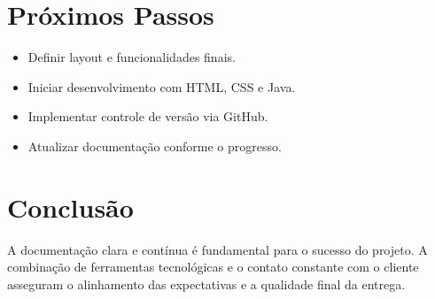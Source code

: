 \documentclass[a4paper,12pt]{article}
\begin{document}
\section{Próximos Passos}
\begin{itemize}
  \item Definir layout e funcionalidades finais.
  \item Iniciar desenvolvimento com HTML, CSS e Java.
  \item Implementar controle de versão via GitHub.
  \item Atualizar documentação conforme o progresso.
\end{itemize}

\section{Conclusão}
A documentação clara e contínua é fundamental para o sucesso do projeto. A combinação de ferramentas tecnológicas e o contato constante com o cliente asseguram o alinhamento das expectativas e a qualidade final da entrega.
\end{document}
